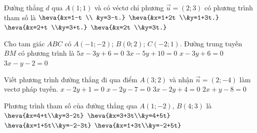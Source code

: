 \begin{ex}%
	Đường thẳng $d$ qua $A(1; 1)$ và có véctơ  chỉ phương $\overrightarrow{u}=(2; 3)$ có phương trình tham số là
	 \def\dotEX{}
	\choice 
		{$\heva{&x=1-t \\ &y=3-t.}$} 
		{\True  $\heva{&x=1+2t \\&y=1+3t.}$}
		 {$\heva{&x=2+t \\&y=3+t.}$}
		 {$\heva{&x=2t \\&y=3t.}$}
\end{ex}

\begin{ex}%
	Cho tam giác $ABC$ có $A(-1;-2)$; $B(0; 2)$; $C(-2; 1)$. Đường trung tuyến $BM$  có phương trình là
	 \choice
		{\True  $5x-3y+6=0$}
		 {$3x-5y+10=0$}
		{$x-3y+6=0$} 
		 {$3x-y-2=0$}
\end{ex}

\begin{ex}%
	Viết phương trình đường thẳng đi qua điểm $A(3;2)$ và nhận $\overrightarrow{n}=(2;-4)$ làm vectơ pháp  tuyến.
	 \choice
		{\True $x-2y+1=0$} 
		 {$x-2y-7=0$}
		 {$3x-2y+4=0$}
		{$2x+y-8=0$} 
\end{ex}

\begin{ex}%
	Phương trình tham số của đường  thẳng qua $A(1;-2)$, $B(4;3)$ là
	\choice 
		{$\heva{&x=4+t\\&y=3-2t}$} 
		 {$\heva{&x=3+3t\\&y=4+5t}$}
		{$\heva{&x=1+5t\\&y=-2-3t}$} 
		{\True  $\heva{&x=1+3t\\&y=-2+5t}$}
\end{ex}

